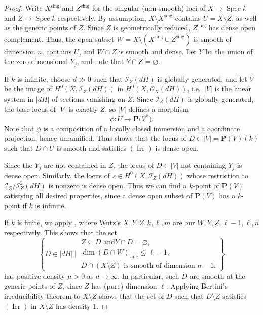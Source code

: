 \documentclass[11pt]{amsart}
\theoremstyle{definition}
\renewcommand{\P}{\mathbf P}
\newcommand{\Spec}{\operatorname{Spec}}
\newcommand{\Irr}{\operatorname{Irr}}
\newcommand{\sing}{^{\operatorname{sing}}}
\begin{document}
\begin{proof}
Write $X\sing$ and $Z\sing$ for the singular (non-smooth) loci of
$X \to \Spec k$ and $Z \to \Spec k$
respectively. By assumption, $X \setminus X\sing$ contains $U = X
\setminus Z$, as well as the generic points of $Z$. Since $Z$ is
geometrically reduced, $Z\sing$ has dense open complement. Thus, the
open subset $W = X \setminus (X\sing \cup Z\sing)$ is smooth of
dimension $n$, contains $U$, and $W \cap Z$ is smooth and dense. Let
$Y$ be the union of the zero-dimensional $Y_j$, and note that $Y
\cap Z = \varnothing$.

If $k$ is infinite, choose $d \gg 0$ such that $\mathcal I_Z(dH)$ is
globally generated, and let $V$ be the image of $H^0(X,\mathcal
I_Z(dH))$ in $H^0(X,\mathcal O_X(dH))$, i.e.\ $|V|$ is the linear
system in $|dH|$ of sections vanishing on $Z$. Since $\mathcal
I_Z(dH)$ is globally generated, the base locus of $|V|$ is exactly
$Z$, so $|V|$ defines a morphism
\[
\phi \colon U \to \P\big(V^*\big).
\]
Note that $\phi$ is a composition of a locally closed immersion and
a coordinate projection, hence unramified. Thus
\cite[Corollary~I.6.11(2,3)]{JouBer} shows that the locus of $D \in |V| =
\P(V)(k)$ such that $D \cap U$ is smooth and satisfies $(\Irr)$ is
dense open.

Since the $Y_j$ are not contained in $Z$, the locus of $D \in |V|$
not containing $Y_j$ is dense open. Similarly, the locus of $s \in
H^0(X,\mathcal I_Z(dH))$ whose restriction to $\mathcal I_Z/\mathcal
I_Z^2(dH)$ is nonzero is dense open. Thus we can find a $k$-point of
$\P(V)$ satisfying all desired properties, since a dense open subset
of $\P(V)$ has a $k$-point if $k$ is infinite.

If $k$ is finite, we apply \cite[Theorem~2.1]{Wutz}, where Wutz's
$X,Y,Z,k,\ell,m$ are our $W, Y, Z, \ell-1, \ell, n$ respectively.
This shows that the set
\[
\left\{D \in |dH|\ \Bigg|\ \begin{array}{l} Z \subseteq D \text{ and
} Y \cap D = \varnothing, \\ \dim (D \cap W)_{\operatorname{sing}}
\leq \ell - 1,  \\ D \cap (X \setminus Z) \text{ is smooth of
dimension } n-1. \end{array}\right\}
\]
has positive density $\mu > 0$ as $d \to \infty$. %
%
In particular, such $D$ are smooth at the generic points of $Z$,
since $Z$ has (pure) dimension $\ell$. Applying Bertini's
irreducibility theorem \cite[Theorem~1.2]{ChaPoo} to $X \setminus Z$
shows that the set of $D$ such that $D \setminus Z$ satisfies
$(\Irr)$ in $X \setminus Z$ has density $1$.


\end{proof}
\end{document}
